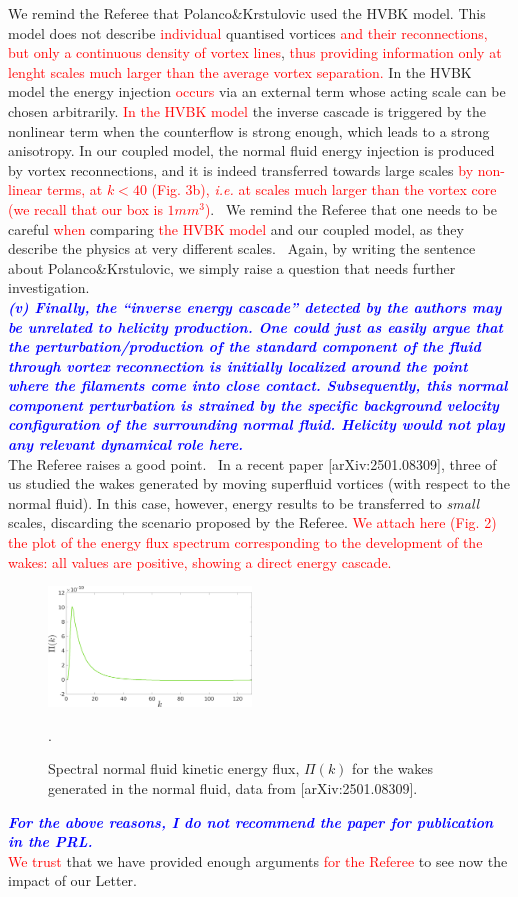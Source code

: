 \documentclass[a4paper,10pt]{article}
\def\red#1{\textcolor{red}{#1}}
\def\blue#1{\textcolor{blue}{#1}}
\def\refcomment#1{\textbf{\blue{\emph{#1}}}\\}
\begin{document}
We remind the Referee that Polanco\&Krstulovic used the HVBK model. 
This model does not describe \red{individual} quantised vortices 
\red{and their reconnections, but only a continuous density of vortex lines}, 
\red{thus providing information only at lenght scales 
much larger than the average vortex separation.} In the HVBK model
the energy injection
\red{occurs} via an external term whose acting scale can be chosen
arbitrarily. 
\red{In the HVBK model} the inverse cascade is triggered by the nonlinear 
term when the counterflow 
is strong enough, which leads to a strong anisotropy. 
In our coupled model, the normal fluid energy injection is produced 
by vortex reconnections, and it is indeed transferred towards large scales 
\red{by non-linear terms, at $k < 40$ (Fig. 3b), \textit{i.e.} at scales much larger than the vortex core (we recall that our box is
$1mm^3$)}. 
We remind the Referee that one needs to be careful \red{when}
comparing \red{the HVBK model} and our coupled model,
as they describe the physics at very different scales.  Again, by writing the sentence about Polanco\&Krstulovic, we simply raise a question that needs further investigation.\\

\refcomment{(v) Finally, the “inverse energy cascade” detected by the authors may be unrelated to helicity production. One could just as easily argue that the perturbation/production of the standard component of the fluid through vortex reconnection is initially localized around the point where the filaments come into close contact. Subsequently, this normal component perturbation is strained by the specific background velocity configuration of the surrounding normal fluid. Helicity would not play any relevant dynamical role here.}

The Referee raises a good point.  In a recent paper [arXiv:2501.08309], three of us studied the wakes generated by moving superfluid vortices (with respect to the normal fluid). In this case, however, energy results to be transferred to \textit{small} scales, discarding the scenario proposed by the Referee. \red{We attach here (Fig. 2) the plot of the energy flux spectrum corresponding to the development of the wakes: all values are positive, showing a direct energy cascade.} \\



%
\begin{figure}[h!]
    \centering
    \includegraphics*[width=0.48\textwidth]{flux_wakes.png}
    \caption{Spectral normal fluid kinetic energy flux, $\Pi (k)$ for the wakes generated in the normal fluid, data from [arXiv:2501.08309].}.
    
\end{figure}

\refcomment{For the above reasons, I do not recommend the paper for publication in the PRL.}

\noindent \red{We trust} that we have provided enough arguments 
\red{for the Referee} to see now the impact of our Letter.
\end{document}
